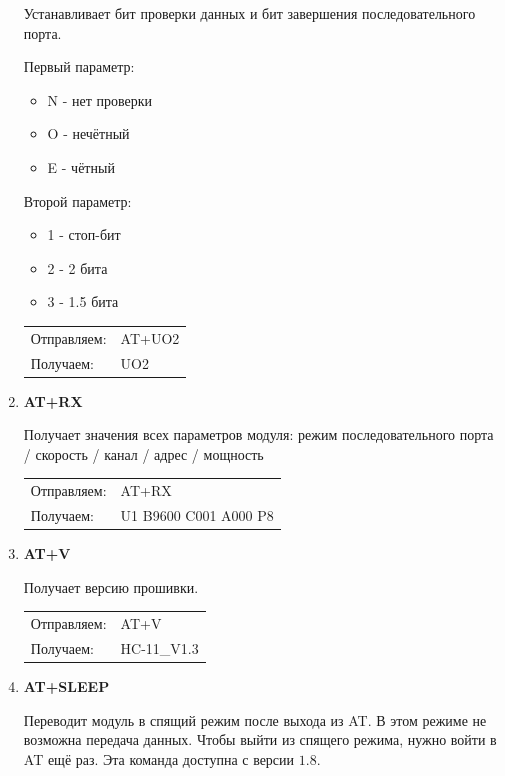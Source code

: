 \documentclass[bibliography=totocnumbered]{scrartcl}
\begin{document}
\begin{enumerate}
Устанавливает бит проверки данных и бит завершения последовательного порта.

Первый параметр:

\begin{itemize}
\item N - нет проверки
\item O - нечётный
\item E - чётный 

\end{itemize}

Второй параметр:
\begin{itemize}
\item 1 - стоп-бит
\item 2 - 2 бита
\item 3 - 1.5 бита

\end{itemize}

\begin{tabular}{ l l }
  Отправляем: & AT+UO2 \\
  Получаем: & UO2 \\
\end{tabular}

  
\item \textbf{AT+RX}

Получает значения всех параметров модуля:  
режим последовательного порта / скорость / канал / адрес / мощность 

\begin{tabular}{ l l }
  Отправляем: & AT+RX \\
  Получаем: & U1 B9600 C001 A000 P8 \\
\end{tabular}

\item \textbf{AT+V}

Получает версию прошивки.

\begin{tabular}{ l l }
  Отправляем: & AT+V \\
  Получаем: & HC-11\_V1.3\\
\end{tabular}



\item \textbf{AT+SLEEP}

Переводит модуль в спящий режим после выхода из AT. В этом режиме не возможна передача данных. Чтобы выйти из спящего режима, нужно войти в AT ещё раз. Эта команда доступна с версии $1.8$.


\end{enumerate}
\end{document}
